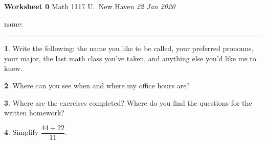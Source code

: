 \documentclass[11pt]{amsart}
\theoremstyle{definition}
\newtheorem{q}{}
\begin{document}

\begin{flushright}
  \textbf{Worksheet 0} \linebreak %
  {Math 1117} \linebreak %
  {U.~New Haven} \linebreak %
  \textit{22 Jan 2020} %
\end{flushright}


\begin{flushleft}
  name: \rule{10cm}{0.4pt} \linebreak
\end{flushleft}


\begin{q}
Write the following: the name you like to be called, your
preferred pronouns, your major, the last math class you've taken,
and anything else you'd like me to know.
\vspace{1in}
\end{q}

\begin{q}
  Where can you see when and where my office hours are?

  \centering
\end{q}

\begin{q}
  Where are the exercises completed?  Where do you find the
  questions for the written homework?

    \centering
\end{q}

\begin{q}
  Simplify $ \dfrac{44+22}{11} $.

    \centering
\end{q}
\pagebreak
\end{document}
